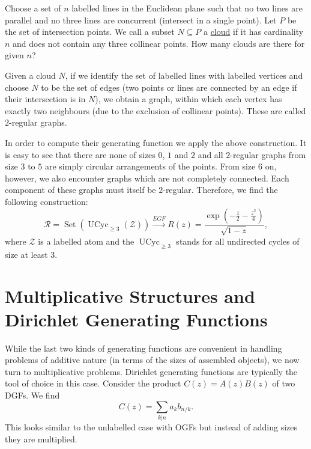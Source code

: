 \begin{exm}
\label{ex:reggraphs}
Choose a set of $n$ labelled lines in the Euclidean plane such that no two lines are parallel and no three lines are concurrent (intersect in a single point). 
Let $P$ be the set of intersection points.
We call a subset $N \subseteq P$ a \ul{cloud} if it has cardinality $n$ and does not contain any three collinear points.
How many clouds are there for given $n$?

Given a cloud $N$, if we identify the set of labelled lines with labelled vertices and choose $N$ to be the set of edges (two points or lines are connected by an edge if their intersection is in $N$), we obtain a graph, within which each vertex has exactly two neighbours (due to the exclusion of collinear points).
These are called $2$-regular graphs.

In order to compute their generating function we apply the above construction. 
It is easy to see that there are none of sizes $0$, $1$ and $2$ and all $2$-regular graphs from size $3$ to $5$ are simply circular arrangements of the points.
From size $6$ on, however, we also encounter graphs which are not completely connected.
Each component of these graphs must itself be $2$-regular.
Therefore, we find the following construction:
\begin{equation*}
    \mathcal{R} = \operatorname{Set}(\operatorname{UCyc}_{\geq 3} (\mathcal{Z})) \xrightarrow{EGF} R(z) = \frac{\exp(-\frac{z}{2} - \frac{z^2}{4})}{\sqrt{1 - z}}, 
\end{equation*}
where $\mathcal{Z}$ is a labelled atom and the $\operatorname{UCyc}_{\geq 3}$ stands for all undirected cycles of size at least $3$.
\end{exm}









\section{Multiplicative Structures and Dirichlet Generating Functions}
While the last two kinds of generating functions are convenient in handling problems of additive nature (in terms of the sizes of assembled objects), we now turn to multiplicative problems. 
Dirichlet generating functions are typically the tool of choice in this case. 
Consider the product $C(z) = A(z) B(z)$ of two DGFs. We find
\begin{equation*}
    [n^z] C(z) = \sum_{k | n} a_k b_{n/k}.
\end{equation*}
This looks similar to the unlabelled case with OGFs but instead of adding sizes they are multiplied.

